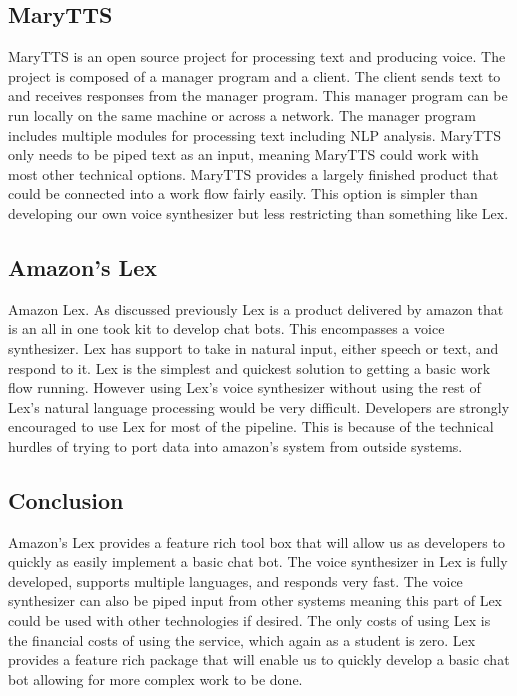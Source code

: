 \documentclass[onecolumn, draftclsnofoot,10pt, compsoc]{IEEEtran}
\begin{document}
    \subsection{MaryTTS}
    MaryTTS is an open source project for processing text and producing voice.
    The project is composed of a manager program and a client.
    The client sends text to and receives responses from the manager program.
    This manager program can be run locally on the same machine or across a network.
    The manager program includes multiple modules for processing text including NLP analysis.
    MaryTTS only needs to be piped text as an input, meaning MaryTTS could work with most other technical options.
    MaryTTS provides a largely finished product that could be connected into a work flow fairly easily.
    This option is simpler than developing our own voice synthesizer but less restricting than something like Lex.
    
    \subsection{Amazon's Lex}
    Amazon Lex. 
    As discussed previously Lex is a product delivered by amazon that is an all in one took kit to develop chat bots.
    This encompasses a voice synthesizer. Lex has support to take in natural input, either speech or text, and respond to it.
    Lex is the simplest and quickest solution to getting a basic work flow running.
    However using Lex’s voice synthesizer without using the rest of Lex’s natural language processing would be very difficult.
    Developers are strongly encouraged to use Lex for most of the pipeline.
    This is because of the technical hurdles of trying to port data into amazon’s system from outside systems.
    
    \subsection{Conclusion}
    Amazon's Lex provides a feature rich tool box that will allow us as developers to quickly as easily implement a basic chat bot. 
    The voice synthesizer in Lex is fully developed, supports multiple languages, and responds very fast.
    The voice synthesizer can also be piped input from other systems meaning this part of Lex could be used with other technologies if desired. 
    The only costs of using Lex is the financial costs of using the service, which again as a student is zero. 
    Lex provides a feature rich package that will enable us to quickly develop a basic chat bot allowing for more complex work to be done.
\end{document}
